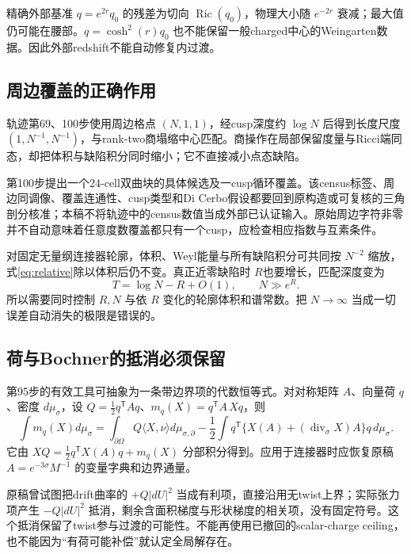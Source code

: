 \documentclass[UTF8,a4paper,11pt,fontset=fandol]{ctexart}
\numberwithin{equation}{section}
\theoremstyle{definition}
\newcommand{\Ric}{\operatorname{Ric}}
\begin{document}
精确外部基准 $q=e^{2r}q_0$ 的残差为切向 $\Ric(q_0)$，物理大小随 $e^{-2r}$ 衰减；最大值仍可能在腰部。$q=\cosh^2(r)q_0$ 也不能保留一般charged中心的Weingarten数据。因此外部redshift不能自动修复内过渡。

\subsection{周边覆盖的正确作用}
轨迹第69、100步使用周边格点 $(N,1,1)$，经cusp深度约 $\log N$ 后得到长度尺度 $(1,N^{-1},N^{-1})$，与rank-two商塌缩中心匹配。商操作在局部保留度量与Ricci端同态，却把体积与缺陷积分同时缩小；它不直接减小点态缺陷。

第100步提出一个24-cell双曲块的具体候选及一cusp循环覆盖。该census标签、周边同调像、覆盖连通性、cusp类型和Di Cerbo假设都要回到原构造或可复核的三角剖分核准；本稿不将轨迹中的census数值当成外部已认证输入。原始周边字符非零并不自动意味着任意度数覆盖都只有一个cusp，应检查相应指数与互素条件。

对固定无量纲连接器轮廓，体积、Weyl能量与所有缺陷积分可共同按 $N^{-2}$ 缩放，式\eqref{eq:relative}除以体积后仍不变。真正近零缺陷时 $R$也要增长，匹配深度变为
\begin{equation}\label{eq:RN}
T=\log N-R+O(1),\qquad N\gg e^R.
\end{equation}
所以需要同时控制 $R,N$ 与依 $R$ 变化的轮廓体积和谱常数。把 $N\to\infty$ 当成一切误差自动消失的极限是错误的。

\subsection{荷与Bochner的抵消必须保留}
第95步的有效工具可抽象为一条带边界项的代数恒等式。对对称矩阵 $A$、向量荷 $q$、密度 $d\mu_\sigma$，设 $Q=\frac12q^{\mathsf T}Aq$、$m_q(X)=q^{\mathsf T}A\,Xq$，则
\begin{equation}\label{eq:charge}
\int m_q(X)d\mu_\sigma=
\int_{\partial\Omega}Q\langle X,\nu\rangle d\mu_{\sigma,\partial}
-\frac12\int q^{\mathsf T}\{X(A)+(\operatorname{div}_\sigma X)A\}q\,d\mu_\sigma.
\end{equation}
它由 $XQ=\frac12q^{\mathsf T}X(A)q+m_q(X)$ 分部积分得到。应用于连接器时应恢复原稿 $A=e^{-3\sigma}M^{-1}$ 的变量字典和边界通量。

原稿曾试图把drift曲率的 $+Q|dU|^2$ 当成有利项，直接沿用无twist上界；实际张力项产生 $-Q|dU|^2$ 抵消，剩余含面积梯度与形状梯度的相关项，没有固定符号。这个抵消保留了twist参与过渡的可能性。不能再使用已撤回的scalar-charge ceiling，也不能因为“有荷可能补偿”就认定全局解存在。
\end{document}

